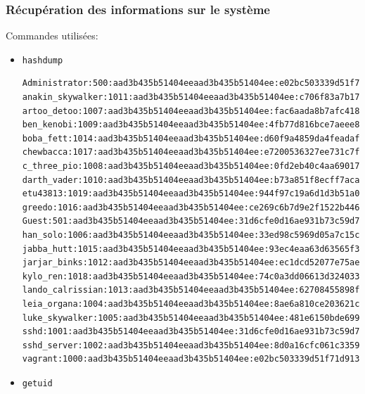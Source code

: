 \documentclass[a4paper]{article}
\begin{document}
\subsubsection{Récupération des informations sur le système}


Commandes utilisées:
\begin{itemize}
    \item \texttt{\footnotesize hashdump}
    \begin{example}
\begin{Verbatim}[fontsize=\footnotesize]
Administrator:500:aad3b435b51404eeaad3b435b51404ee:e02bc503339d51f71d913c245d35b50b:::
anakin_skywalker:1011:aad3b435b51404eeaad3b435b51404ee:c706f83a7b17a0230e55cde2f3de94fa:::
artoo_detoo:1007:aad3b435b51404eeaad3b435b51404ee:fac6aada8b7afc418b3afea63b7577b4:::
ben_kenobi:1009:aad3b435b51404eeaad3b435b51404ee:4fb77d816bce7aeee80d7c2e5e55c859:::
boba_fett:1014:aad3b435b51404eeaad3b435b51404ee:d60f9a4859da4feadaf160e97d200dc9:::
chewbacca:1017:aad3b435b51404eeaad3b435b51404ee:e7200536327ee731c7fe136af4575ed8:::
c_three_pio:1008:aad3b435b51404eeaad3b435b51404ee:0fd2eb40c4aa690171ba066c037397ee:::
darth_vader:1010:aad3b435b51404eeaad3b435b51404ee:b73a851f8ecff7acafbaa4a806aea3e0:::
etu43813:1019:aad3b435b51404eeaad3b435b51404ee:944f97c19a6d1d3b51a073b1746df642:::
greedo:1016:aad3b435b51404eeaad3b435b51404ee:ce269c6b7d9e2f1522b44686b49082db:::
Guest:501:aad3b435b51404eeaad3b435b51404ee:31d6cfe0d16ae931b73c59d7e0c089c0:::
han_solo:1006:aad3b435b51404eeaad3b435b51404ee:33ed98c5969d05a7c15c25c99e3ef951:::
jabba_hutt:1015:aad3b435b51404eeaad3b435b51404ee:93ec4eaa63d63565f37fe7f28d99ce76:::
jarjar_binks:1012:aad3b435b51404eeaad3b435b51404ee:ec1dcd52077e75aef4a1930b0917c4d4:::
kylo_ren:1018:aad3b435b51404eeaad3b435b51404ee:74c0a3dd06613d3240331e94ae18b001:::
lando_calrissian:1013:aad3b435b51404eeaad3b435b51404ee:62708455898f2d7db11cfb670042a53f:::
leia_organa:1004:aad3b435b51404eeaad3b435b51404ee:8ae6a810ce203621cf9cfa6f21f14028:::
luke_skywalker:1005:aad3b435b51404eeaad3b435b51404ee:481e6150bde6998ed22b0e9bac82005a:::
sshd:1001:aad3b435b51404eeaad3b435b51404ee:31d6cfe0d16ae931b73c59d7e0c089c0:::
sshd_server:1002:aad3b435b51404eeaad3b435b51404ee:8d0a16cfc061c3359db455d00ec27035:::
vagrant:1000:aad3b435b51404eeaad3b435b51404ee:e02bc503339d51f71d913c245d35b50b:::
\end{Verbatim}
    \end{example}
    \item \texttt{\footnotesize getuid}
    \begin{example}
\begin{Verbatim}[fontsize=\footnotesize]

\end{Verbatim}
\end{example}
\end{itemize}
\end{document}
